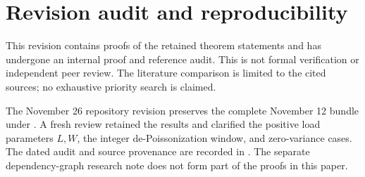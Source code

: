 \documentclass[11pt]{article}
\numberwithin{equation}{section}
\theoremstyle{definition}
\theoremstyle{remark}
\begin{document}
\section{Revision audit and reproducibility}\label{app:audit}

This revision contains proofs of the retained theorem statements and has
undergone an internal proof and reference audit. This is not formal verification
or independent peer review. The literature comparison is limited to the cited
sources; no exhaustive priority search is claimed.

The November 26 repository revision preserves the complete November 12 bundle
under . A fresh review retained the results and clarified
the positive load parameters $L,W$, the integer de-Poissonization window, and
zero-variance cases. The dated audit and source provenance are recorded in
. The separate dependency-graph research note does not
form part of the proofs in this paper.
\end{document}
